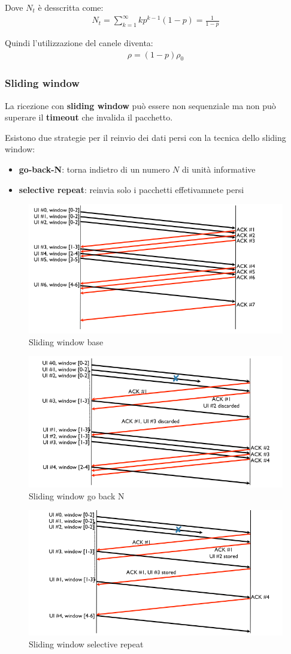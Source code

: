Dove $N_t$ è desscritta come:
\begin{align}
	N_t = \sum_{k=1}^{\infty} k p^{k-1} (1-p) = \frac{1}{1-p}
\end{align}

Quindi l'utilizzazione del canele diventa:
\begin{align}
	\rho = (1 - p) \rho_0
\end{align}


\subsubsection{Sliding window}
La ricezione con \textbf{sliding window} può essere non sequenziale ma non può superare il \textbf{timeout} che invalida il pacchetto.

Esistono due strategie per il reinvio dei dati persi con la tecnica dello sliding window:
\begin{itemize}
  \item \textbf{go-back-N}: torna indietro di un numero $N$ di unità informative
  \item \textbf{selective repeat}: reinvia solo i pacchetti effetivamnete persi
\end{itemize}

\begin{figure}[!ht]
	\centering
	\includegraphics[width=0.4\columnwidth]{./images/sliding_window_base.png}
  \caption{Sliding window base}
  \label{fig:sliding_window_base}
\end{figure}


\begin{figure}[!ht]
	\centering
	\includegraphics[width=0.4\columnwidth]{./images/sliding_window_go_back_n.png}
  \caption{Sliding window go back N}
  \label{fig:sliding_window_go_back_n}
\end{figure}

\begin{figure}[!ht]
	\centering
	\includegraphics[width=0.4\columnwidth]{./images/sliding_window_selective_repeat.png}
  \caption{Sliding window selective repeat}
  \label{fig:sliding_window_selective_repeat}
\end{figure}



